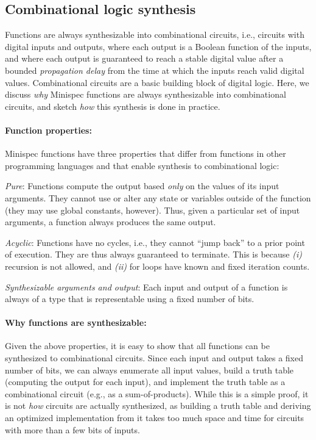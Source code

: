 \subsection{Combinational logic synthesis}
\label{sec:combinational}

Functions are always synthesizable into combinational circuits, i.e.,
circuits with digital inputs and outputs, where each output is a Boolean function of the inputs,
and where each output is guaranteed to reach a stable digital value after
a bounded \emph{propagation delay} from the time at which the inputs reach valid digital values.
Combinational circuits are a basic building block of digital logic.
Here, we discuss \emph{why} Minispec functions are always synthesizable into combinational circuits, and
sketch \emph{how} this synthesis is done in practice.

\paragraph{Function properties:}
Minispec functions have three properties that differ from
functions in other programming languages and that enable synthesis to combinational logic:
\begin{compactenum}
\item \emph{Pure}: Functions compute the output based \emph{only} on the values of its input arguments.
  They cannot use or alter any state or variables outside of the function
  (they may use global constants, however).
  Thus, given a particular set of input arguments, a function always produces the same output.
\item \emph{Acyclic}: Functions have no cycles, i.e., they cannot ``jump back'' to a prior point of execution. 
  They are thus always guaranteed to terminate.
  This is because \emph{(i)} recursion is not allowed, and \emph{(ii)} for loops have known and fixed iteration counts.
\item \emph{Synthesizable arguments and output}: Each input and output of a function is always
  of a type that is representable using a fixed number of bits.
\end{compactenum}

\paragraph{Why functions are synthesizable:}
Given the above properties, it is easy to show that all functions can be synthesized to combinational circuits.
Since each input and output takes a fixed number of bits, we can always
enumerate all input values, build a truth table (computing the output for each input),
and implement the truth table as a combinational circuit (e.g., as a sum-of-products).
While this is a simple proof, it is not \emph{how} circuits are actually synthesized,
as building a truth table and deriving an optimized implementation from it
takes too much space and time for circuits with more than a few bits of inputs.

